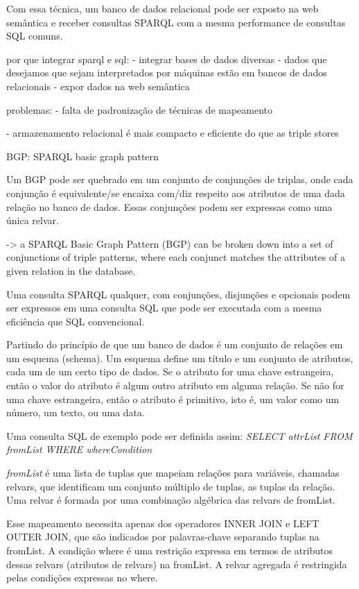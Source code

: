 Com essa técnica, um banco de dados relacional pode ser exposto na web
semântica e receber consultas SPARQL com a mesma performance de consultas
SQL comuns.


por que integrar sparql e sql:
- integrar bases de dados diversas
- dados que desejamos que sejam interpretados por máquinas estão em bancos
de dados relacionais
- expor dados na web semântica

problemas:
- falta de padronização de técnicas de mapeamento

- armazenamento relacional é mais compacto e eficiente do que as triple
stores

BGP: SPARQL basic graph pattern

Um BGP pode ser quebrado em um conjunto de conjunções de triplas, onde
cada conjunção é equivalente/se encaixa com/diz respeito aos atributos
de uma dada relação no banco de dados. Essas conjunções podem ser
expressas como uma única relvar. %

-> a SPARQL Basic Graph Pattern (BGP) can be broken down into a set
of conjunctions of triple patterns, where each conjunct matches the
attributes of a given relation in the database.

Uma consulta SPARQL qualquer, com conjunções, disjunções e opcionais
podem ser expressos em uma consulta SQL que pode ser executada com a
mesma eficiência que SQL convencional.

Partindo do princípio de que um banco de dados é um conjunto de relações
em um esquema (schema). Um esquema define um título e um conjunto de
atributos, cada um de um certo tipo de dados. Se o atributo for uma
chave estrangeira, então o valor do atributo é algum outro atributo
em alguma relação. Se não for uma chave estrangeira, então o atributo
é primitivo, isto é, um valor como um número, um texto, ou uma data.

Uma consulta SQL de exemplo pode ser definida assim:
\textit{SELECT attrList FROM fromList WHERE whereCondition}

\textit{fromList} é uma lista de tuplas que mapeiam relações para variáveis,
chamadas relvars, que identificam um conjunto múltiplo de tuplas, as tuplas
da relação. Uma relvar é formada por uma combinação algébrica das relvars
de fromList.

Esse mapeamento necessita apenas dos operadores INNER JOIN e LEFT OUTER JOIN,
que são indicados por palavras-chave separando tuplas na fromList. A condição where
é uma restrição expressa em termos de atributos dessas relvars (atributos de relvars)
na fromList. A relvar agregada é restringida pelas condições expressas no where.

